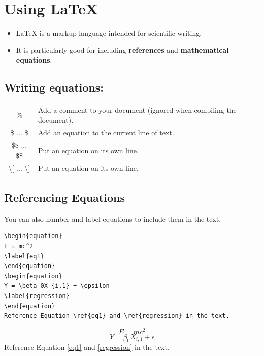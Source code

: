 \documentclass[12pt]{notes}
\begin{document}
\section{Using LaTeX}
\begin{itemize}
\item LaTeX is a markup language intended for scientific writing. 
\item It is particularly good for including \textbf{references} and \textbf{mathematical equations}. 
\end{itemize}

\subsection*{Writing equations:}

\begin{tabular}{cl}
\% & Add a comment to your document (ignored when compiling the document).  \\
\$ ... \$ & Add an equation to the current line of text. \\
\$\$ ... \$\$ & Put an equation on its own line. \\
\textbackslash[ ... \textbackslash] & Put an equation on its own line.  \\
\end{tabular}

\subsection*{Referencing Equations}
You can also number and label equations to include them in the text. 

\begin{verbatim}
\begin{equation}
E = mc^2
\label{eq1}
\end{equation}
\begin{equation}
Y = \beta_0X_{i,1} + \epsilon
\label{regression}
\end{equation}
Reference Equation \ref{eq1} and \ref{regression} in the text.  
\end{verbatim}

\begin{equation}
E = mc^2
\label{eq1}
\end{equation}
\begin{equation}
Y = \beta_0X_{i,1} + \epsilon
\label{regression}
\end{equation}
Reference Equation \ref{eq1} and \ref{regression} in the text.  
\end{document}
